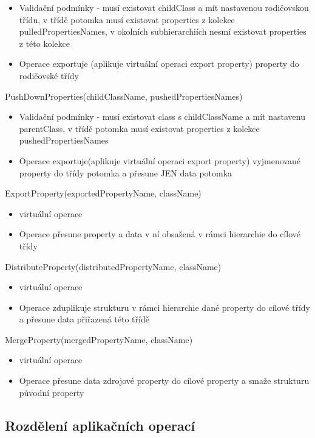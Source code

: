 \documentclass[11pt,twoside,a4paper]{book}
\begin{document}
\begin{list}{Operace :}{}
\begin{itemize}
    \item Validační podmínky - musí existovat childClass a mít nastavenou
    rodičovskou třídu, v třídě potomka musí existovat properties z kolekce
    pulledPropertiesNames, v okolních subhierarchiích nesmí existovat properties
    z této kolekce
    \item Operace exportuje (aplikuje virtuální operaci export property)
    property do rodičovské třídy
  \end{itemize}
  \item PushDownProperties(childClassName, pushedPropertiesNames)
  \begin{itemize}
    \item Validační podmínky - musí existovat class s childClassName a mít
    nastavenu parentClass, v třídě potomka musí existovat properties z kolekce
    pushedPropertiesNames
    \item Operace exportuje(aplikuje virtuální operaci export property) 
   vyjmenované property do třídy potomka a přesune JEN data potomka
  \end{itemize}
  \item ExportProperty(exportedPropertyName, className)
  \begin{itemize}
    \item virtuální operace
    \item Operace přesune property a data v ní obsažená v rámci hierarchie do
    cílové třídy
  \end{itemize}
  \item DistributeProperty(distributedPropertyName, className)
  \begin{itemize}
    \item virtuální operace
    \item Operace zduplikuje strukturu v rámci hierarchie dané property do
    cílové třídy a přesune data přiřazená této třídě
  \end{itemize}
  \item MergeProperty(mergedPropertyName, className)
  \begin{itemize}
    \item virtuální operace
    \item Operace přesune data zdrojové property do cílové property a smaže
    strukturu původní property
  \end{itemize}
\end{list}

\subsection {Rozdělení aplikačních operací} 
\end{document}
